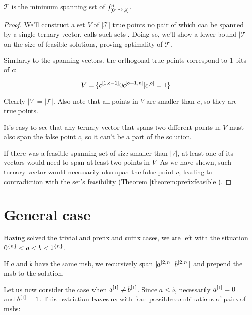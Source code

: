\begin{theorem}[Optimality]
$\mathcal{T}$ is the minimum spanning set of
$f^{n}_{[0^{\{n\}}, b]}$.
\end{theorem}

\begin{proof}
We'll construct a set $V$ of $|\mathcal{T}|$ true points
no pair of which can be spanned by a single ternary vector.
\dubovsky{}\cite{Dubovsky2012} calls such sets
.
Doing so, we'll show a lower bound $|\mathcal{T}|$
on the size of feasible solutions,
proving optimality of $\mathcal{T}$.

Similarly to the spanning vectors,
the orthogonal true points correspond to $1$-bits of $c$:

\begin{equation}
V =
\{c^{[1, o - 1]} 0 c^{[o + 1, n]} |
c^{[o]} = 1\}
\end{equation}

Clearly $|V| = |\mathcal{T}|$.
Also note that all points in $V$ are smaller than $c$,
so they are true points.

It's easy to see that any ternary vector that spans two
different points in $V$ must also span the false point $c$,
so it can't be a part of the solution.

If there was a feasible spanning set
of size smaller than $|V|$,
at least one of its vectors would need to span at least
two points in $V$.
As we have shown, such ternary vector would necessarily
also span the false point $c$,
leading to contradiction with the set's feasibility
(Theorem \ref{theorem:prefixfeasible}).
\end{proof}

\section{General case}

Having solved the trivial and prefix and suffix cases,
we are left with the situation
$0^{\{n\}} < a < b < 1^{\{n\}}$.

If $a$ and $b$ have the same \acrshort{msb},
we recursively span
$[a^{[2, n]}, b^{[2, n]}]$
and prepend the \acrshort{msb}
to the solution.

Let us now consider the case when
$a^{[1]} \neq b^{[1]}$.
Since $a \leq b$,
necessarily $a^{[1]} = 0$
and $b^{[1]} = 1$.
This restriction leaves us with
four possible combinations of pairs
of \acrshort{msb}s:


